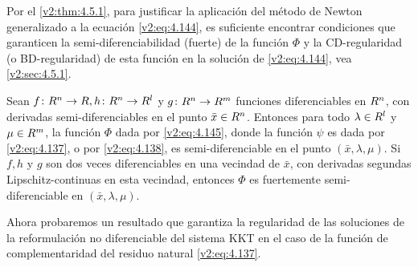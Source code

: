 Por el \cref{v2:thm:4.5.1}, para justificar la aplicación del método de Newton generalizado a la ecuación \eqref{v2:eq:4.144}, es suficiente encontrar condiciones que garanticen la semi-diferenciabilidad (fuerte) de la función $\Phi$ y la CD-regularidad (o BD-regularidad) de esta función en la solución de \eqref{v2:eq:4.144}, vea \cref{v2:sec:4.5.1}.

\begin{proposition}\label{v2:prop:4.5.1}
    Sean $f \colon R^n \to R, h \colon R^n \to R^l$ y $g \colon R^n \to R^m$ funciones diferenciables en $R^n$, con derivadas semi-diferenciables en el punto $\bar{x} \in R^n$.
    Entonces para todo $\lambda \in R^l$ y $\mu \in R^m$, la función $\Phi$ dada por \eqref{v2:eq:4.145}, donde la función $\psi$ es dada por \eqref{v2:eq:4.137}, o por \eqref{v2:eq:4.138}, es semi-diferenciable en el punto $(\bar{x}, \lambda, \mu)$.
    Si $f, h$ y $g$ son dos veces diferenciables en una vecindad de $\bar{x}$, con derivadas segundas Lipschitz-continuas en esta vecindad, entonces $\Phi$ es fuertemente semi-diferenciable en $(\bar{x}, \lambda, \mu)$.
\end{proposition}


Ahora probaremos un resultado que garantiza la regularidad de las soluciones de la reformulación no diferenciable del sistema KKT en el caso de la función de complementaridad del residuo natural \eqref{v2:eq:4.137}.

